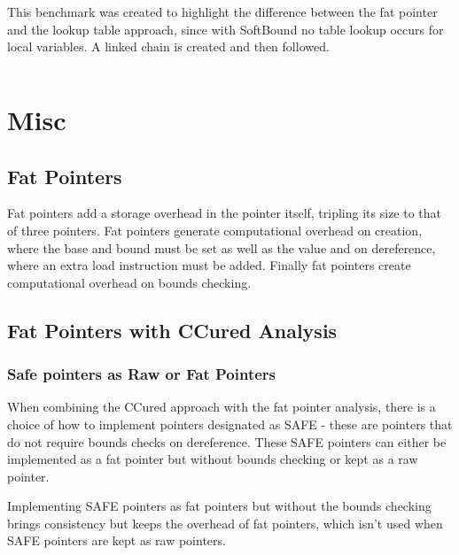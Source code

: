 This benchmark was created to highlight the difference between the fat pointer and the lookup table approach, since with SoftBound no table lookup occurs for local variables.
A linked chain is created and then followed.

\begin{verbatim}
\end{verbatim}

\section{Misc}
\subsection{Fat Pointers}

Fat pointers add a storage overhead in the pointer itself, tripling its size to that of three pointers.
Fat pointers generate computational overhead on creation, where the base and bound must be set as well as the value and on dereference, where an extra load instruction must be added.
Finally fat pointers create computational overhead on bounds checking.

\subsection{Fat Pointers with CCured Analysis}

\subsubsection{Safe pointers as Raw or Fat Pointers}

When combining the CCured approach with the fat pointer analysis, there is a choice of how to implement pointers designated as SAFE - these are pointers that do not require bounds checks on dereference.
These SAFE pointers can either be implemented as a fat pointer but without bounds checking or kept as a raw pointer.

Implementing SAFE pointers as fat pointers but without the bounds checking brings consistency but keeps the overhead of fat pointers, which isn't used when SAFE pointers are kept as raw pointers.

